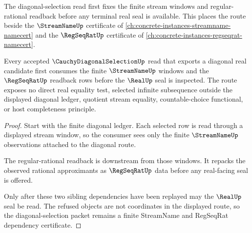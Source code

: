 The diagonal-selection read first fixes the finite stream windows and regular-rational readback before any terminal real seal is available. This places the route beside the $\StreamNameUp$ certificate of \autoref{ch:concrete-instances-streamname-namecert} and the $\RegSeqRatUp$ certificate of \autoref{ch:concrete-instances-regseqrat-namecert}.

\begin{theorem}
\label{thm:cauchy-diagonal-selection-regseqrat-streamname-route}
Every accepted $\CauchyDiagonalSelectionUp$ read that exports a diagonal real candidate first consumes the finite $\StreamNameUp$ windows and the $\RegSeqRatUp$ readback rows before the $\RealUp$ seal is inspected. The route exposes no direct real equality test, selected infinite subsequence outside the displayed diagonal ledger, quotient stream equality, countable-choice functional, or host completeness principle.
\end{theorem}
\begin{proof}
Start with the finite diagonal ledger. Each selected row is read through a displayed stream window, so the consumer sees only the finite $\StreamNameUp$ observations attached to the diagonal route.

The regular-rational readback is downstream from those windows. It repacks the observed rational approximants as $\RegSeqRatUp$ data before any real-facing seal is offered.

Only after these two sibling dependencies have been replayed may the $\RealUp$ seal be read. The refused objects are not coordinates in the displayed route, so the diagonal-selection packet remains a finite StreamName and RegSeqRat dependency certificate.
\end{proof}

